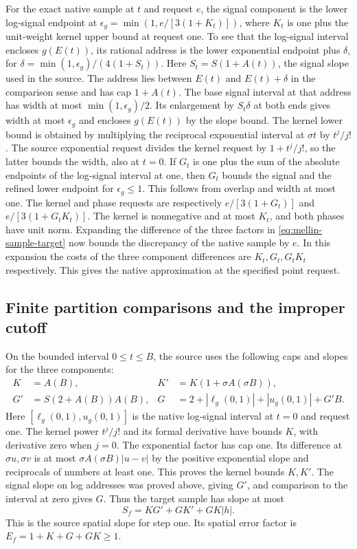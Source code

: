 \documentclass[11pt]{amsart}
\theoremstyle{definition}
\theoremstyle{remark}
\numberwithin{equation}{section}
\begin{document}
For the exact native sample at \(t\) and request \(e\), the signal
component is the lower log-signal endpoint at
\(\epsilon_g=\min(1,e/[3(1+K_t)])\), where \(K_t\) is one plus the
unit-weight kernel upper bound at request one. To see that the
log-signal interval encloses \(g(E(t))\), its rational address is
the lower exponential endpoint plus \(\delta\), for
\(\delta=\min(1,\epsilon_g)/(4(1+S_t))\).
Here \(S_t=S(1+A(t))\), the signal slope used in the source.
The address lies between \(E(t)\) and \(E(t)+\delta\)
in the comparison sense and has cap \(1+A(t)\).
The base signal interval at that address has width at most
\(\min(1,\epsilon_g)/2\). Its enlargement by \(S_t\delta\)
at both ends gives width at most \(\epsilon_g\)
and encloses \(g(E(t))\) by the slope bound.
The kernel lower bound is obtained by multiplying the reciprocal
exponential interval at \(\sigma t\) by \(t^j/j!\).
The source exponential request divides the kernel request by
\(1+t^j/j!\), so the latter bounds the width, also at \(t=0\).
If \(G_t\) is one plus the sum of the absolute endpoints of the
log-signal interval at one, then \(G_t\) bounds the signal and
the refined lower endpoint for \(\epsilon_g\le1\). This follows
from overlap and width at most one. The kernel and phase
requests are respectively \(e/[3(1+G_t)]\) and
\(e/[3(1+G_tK_t)]\). The kernel is nonnegative and at most
\(K_t\), and both phases have unit norm.
Expanding the difference of the three factors in
\eqref{eq:mellin-sample-target} now bounds the discrepancy of the
native sample by \(e\). In this expansion the costs of the three
component differences are \(K_t,G_t,G_tK_t\) respectively.
This gives the native approximation at the specified point
request.

\subsection{Finite partition comparisons and the improper cutoff}
\label{sec:mellin-partitions}

On the bounded interval \(0\le t\le B\), the source uses the
following caps and slopes for the three components:
\begin{align*}
 K&=A(B), & K'&=K(1+\sigma A(\sigma B)),\\
 G'&=S(2+A(B))A(B), &
 G&=2+|\ell_g(0,1)|+|u_g(0,1)|+G'B .
\end{align*}
Here \([\ell_g(0,1),u_g(0,1)]\) is the native log-signal interval
at \(t=0\) and request one. The kernel power \(t^j/j!\)
and its formal derivative have bounds \(K\), with derivative zero
when \(j=0\). The exponential factor has cap one. Its difference
at \(\sigma u,\sigma v\) is at most \(\sigma A(\sigma B)|u-v|\)
by the positive exponential slope and reciprocals of numbers at
least one. This proves the kernel bounds \(K,K'\).
The signal slope on log addresses was proved above, giving \(G'\),
and comparison to the interval at zero gives \(G\).
Thus the target sample has slope at most
\[
              S_f=KG'+GK'+GK|h|.
\]
This is the source spatial slope for step one. Its spatial
error factor is \(E_f=1+K+G+GK\ge1\).
\end{document}
